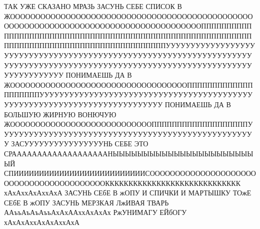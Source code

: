  
 
 
 
 


ТАК УЖЕ СКАЗАНО МРАЗЬ ЗАСУНЬ СЕБЕ СПИСОК В
ЖОООООООООООООООООООООООООООООООООООООООООООООООООООООООООООООООООООООООООООООООООООООООПППППППППППППППППППППППППППППППППППППППППППППППППППППППППППППППППППППППППППППППППППППППППППУУУУУУУУУУУУУУУУУУУУУУУУУУУУУУУУУУУУУУУУУУУУУУУУУУУУУУУУУУУУУУУУУУУУУУУУУУУУУУУУУУУУУУУУУУУУУУУУУУУУУУУУУУУУУУУУУУУУУУУУУУУУУУУУУУ
ПОНИМАЕШЬ ДА В
ЖОООООООООООООООООООООООООООООООООООППППППППППППППППППППУУУУУУУУУУУУУУУУУУУУУУУУУУУУУУУУУУУУУУУУУУУУУУУУУУУУУУУУУУУУУУУУУУУУУУУУУУУ
ПОНИМАЕШЬ ДА В БОЛЬШУЮ ЖИРНУЮ ВОНЮЧУЮ
ЖООООООООООООООООООООООООООООПППППППППППППППППППУУУУУУУУУУУУУУУУУУУУУУУУУУУУУУУУУУУУУУУУУУУУУУУУУУУУ
ЗАСУУУУУУУУУУУУУУУУНЬ СЕБЕ ЭТО СРАААААААААААААААААААНЫЫЫЫЫЫЫЫЫЫЫЫЫЫЫЫЫЫЫЫЫЫЫЫЙ
СПИИИИИИИИИИИИИИИИИИИИИИИИИИСОООООООООООООООООООООООООООООООООООООООООККККККККККККККККККККККККККККК
хАхАххАхАххАхА ЗАСУНЬ СЕбЕ В жОПУ И СПИЧКИ И МАРТЫШКУ ТОжЕ СЕбЕ В жОПУ ЗАСУНЬ
МЕРЗКАЯ ЛжИВАЯ ТВАРЬ ААъъАъАъАъъАхАхААххАхАхАх РжУНИМАГУ ЕЙбОГУ
хАхАхАххАхАхАххАхА
